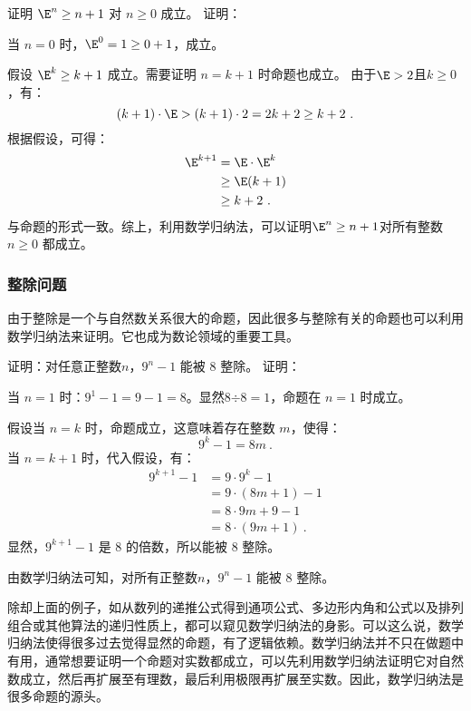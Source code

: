 \begin{example}{证明 $\E^n \geq n+1$ 对 $n \geq 0$ 成立。}
证明：

当 $n = 0$ 时，$\E^0 = 1\geq 0+1$，成立。

假设 $\E^k \geq k+1$ 成立。需要证明 $n = k+1$ 时命题也成立。
由于$\E>2$且$k\geq0$，有：
\begin{equation}
(k + 1) \cdot \E > (k + 1) \cdot 2 = 2k + 2 \geq k + 2~.
\end{equation}
根据假设，可得：
\begin{equation}
\begin{aligned}
\E^{k+1} &= \E \cdot \E^k\\
&\geq \E(k+1)\\
&\geq k+2~.
\end{aligned}
\end{equation}
与命题的形式一致。综上，利用数学归纳法，可以证明$\E^n \geq n+1$对所有整数$n \geq 0$ 都成立。
\end{example}

\subsubsection{整除问题}

由于整除是一个与自然数关系很大的命题，因此很多与整除有关的命题也可以利用数学归纳法来证明。它也成为数论领域的重要工具。

\begin{example}{证明：对任意正整数$n$，$9^{n} - 1$ 能被 $8$ 整除。}
证明：

当 $n = 1$ 时：$9^1 - 1 = 9 - 1 = 8$。显然$8\text{÷}8=1$，命题在 $n = 1$ 时成立。

假设当 $n = k$ 时，命题成立，这意味着存在整数 $m$，使得：
\begin{equation}
9^k - 1 = 8m~.
\end{equation}
当 $n = k+1$ 时，代入假设，有：
\begin{equation}
\begin{aligned}
9^{k+1} - 1 &= 9\cdot9^{k} - 1\\
&= 9\cdot(8m+1)- 1\\
&= 8\cdot9m+9- 1\\
&= 8\cdot(9m+1)~.
\end{aligned}
\end{equation}
显然，$9^{k+1} - 1$ 是 $8$ 的倍数，所以能被 $8$ 整除。

由数学归纳法可知，对所有正整数$n$，$9^{n} - 1$ 能被 $8$ 整除。
\end{example}
除却上面的例子，如从数列的递推公式得到通项公式、多边形内角和公式以及排列组合或其他算法的递归性质上，都可以窥见数学归纳法的身影。可以这么说，数学归纳法使得很多过去觉得显然的命题，有了逻辑依赖。数学归纳法并不只在做题中有用，通常想要证明一个命题对实数都成立，可以先利用数学归纳法证明它对自然数成立，然后再扩展至有理数，最后利用极限再扩展至实数。因此，数学归纳法是很多命题的源头。

